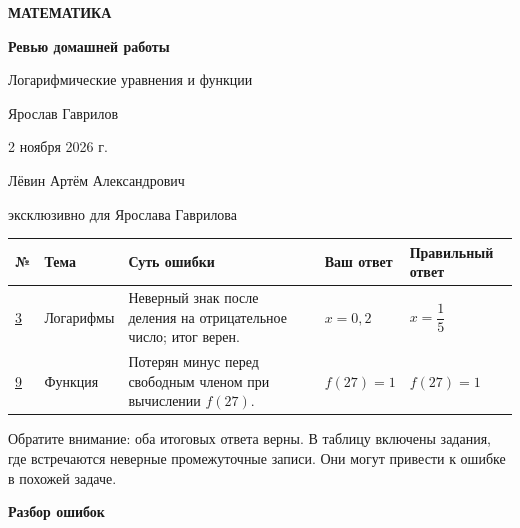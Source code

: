 \documentclass[a4paper,12pt]{article}
\newcommand{\sectiontitle}[1]{\vspace{6mm}{\large\bfseries\color{accent}#1}\par\vspace{2mm}}
\begin{document}
\thispagestyle{empty}
\vspace*{38mm}
\begin{center}
{\small\bfseries\color{accent}МАТЕМАТИКА}\par
\vspace{19mm}
{\Huge\bfseries\color{ink}Ревью домашней работы}\par
\vspace{10mm}
{\Large Логарифмические уравнения и функции}\par
\vspace{27mm}
{\Large Ярослав Гаврилов}\par
\vspace{9mm}
{\large 2 ноября 2026 г.}\par
\end{center}
\vfill
\begin{center}
{\normalsize Лёвин Артём Александрович}\par
{\small\color{muted}эксклюзивно для Ярослава Гаврилова}\par
\vspace{12mm}
\end{center}
\newpage
\sectiontitle{Сводная таблица}
\small
\renewcommand{\arraystretch}{1.4}
\begin{tabularx}{\linewidth}{@{}p{12mm}p{29mm}X p{24mm}p{25mm}@{}}
\toprule
№ & Тема & Суть ошибки & Ваш ответ & Правильный ответ \\
\midrule
\hyperref[task:3]{3} & Логарифмы & Неверный знак после деления на отрицательное число; итог верен. & $x=0{,}2$ & $x=\dfrac15$ \\
\addlinespace[2mm]
\hyperref[task:9]{9} & Функция & Потерян минус перед свободным членом при вычислении $f(27)$. & $f(27)=1$ & $f(27)=1$ \\
\bottomrule
\end{tabularx}
\par\normalsize
\vspace{8mm}
Обратите внимание: оба итоговых ответа верны. В таблицу включены задания, где встречаются неверные промежуточные записи. Они могут привести к ошибке в похожей задаче.
\newpage
\thispagestyle{empty}
\vspace*{0.37\textheight}
\begin{center}
{\Huge\bfseries\color{accent}Разбор ошибок}
\end{center}
\end{document}
